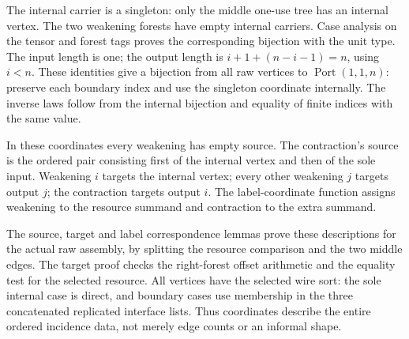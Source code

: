 The internal carrier is a singleton: only the middle one-use tree has an
internal vertex. The two weakening forests have empty internal carriers.
Case analysis on the tensor and forest tags proves the corresponding
bijection with the unit type. The input length is one; the output length is
$i+1+(n-i-1)=n$, using $i<n$. These identities give a bijection from all raw
vertices to $\operatorname{Port}(1,1,n)$: preserve each boundary index and
use the singleton coordinate internally. The inverse laws follow from the
internal bijection and equality of finite indices with the same value.


In these coordinates every weakening has empty source. The contraction's
source is the ordered pair consisting first of the internal vertex and then
of the sole input. Weakening $i$ targets the internal vertex; every other
weakening $j$ targets output $j$; the contraction targets output $i$.
The label-coordinate function assigns weakening to the resource summand
and contraction to the extra summand.


The source, target and label correspondence lemmas prove these descriptions
for the actual raw assembly, by splitting the resource comparison and the
two middle edges. The target proof checks the right-forest offset arithmetic
and the equality test for the selected resource. All vertices have the
selected wire sort: the sole internal case is direct, and boundary cases
use membership in the three concatenated replicated interface lists.
Thus coordinates describe the entire ordered incidence data, not merely
edge counts or an informal shape.


